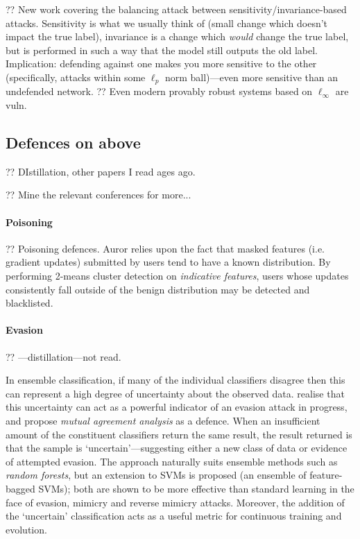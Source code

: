 ?? New work \parencite{DBLP:journals/corr/abs-2002-04599} covering the balancing attack between sensitivity/invariance-based attacks. Sensitivity is what we usually think of (small change which doesn't impact the true label), invariance is a change which \emph{would} change the true label, but is performed in such a way that the model still outputs the old label. Implication: defending against one makes you more sensitive to the other (specifically, attacks within some $\ell_p$ norm ball)---even more sensitive than an undefended network.
?? Even modern provably robust systems based on $\ell_\infty$ \parencite{DBLP:conf/iclr/ZhangCXGSLBH20} are vuln.

\subsection{Defences on above}

?? DIstillation, other papers I read ages ago.

?? Mine the relevant conferences for more...

\paragraph{Poisoning}
?? Poisoning defences. Auror \cite{DBLP:conf/acsac/ShenTS16} relies upon the fact that masked features (i.e. gradient updates) submitted by users tend to have a known distribution.
By performing 2-means cluster detection on \emph{indicative features}, users whose updates consistently fall outside of the benign distribution may be detected and blacklisted.

\paragraph{Evasion}

?? \textcite{DBLP:conf/sp/PapernotM0JS16}---distillation---not read.

In ensemble classification, if many of the individual classifiers disagree then this can represent a high degree of uncertainty about the observed data.
\textcite{DBLP:conf/ndss/SmutzS16} realise that this uncertainty can act as a powerful indicator of an evasion attack in progress, and propose \emph{mutual agreement analysis} as a defence.
When an insufficient amount of the constituent classifiers return the same result, the result returned is that the sample is `uncertain'---suggesting either a new class of data or evidence of attempted evasion.
The approach naturally suits ensemble methods such as \emph{random forests}, but an extension to SVMs is proposed (an ensemble of feature-bagged SVMs); both are shown to be more effective than standard learning in the face of evasion, mimicry and reverse mimicry attacks.
Moreover, the addition of the `uncertain' classification acts as a useful metric for continuous training and evolution.

